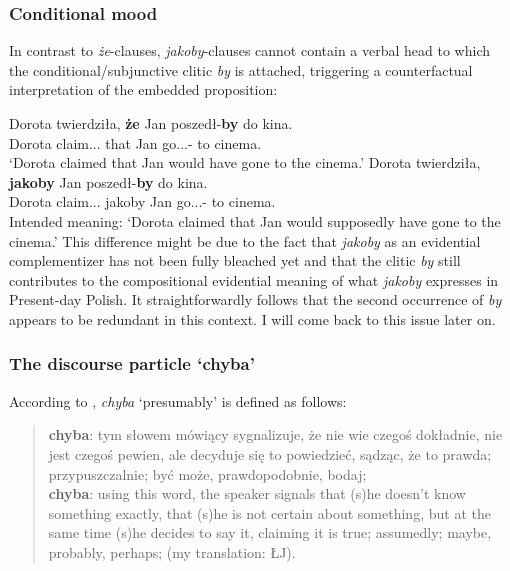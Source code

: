 \documentclass[output=paper
,modfonts
,nonflat]{langsci/langscibook}
\begin{document}
\subsubsection{Conditional mood}
In contrast to \emph{że}-clauses, \emph{jakoby}-clauses cannot contain a verbal head to which the conditional\slash subjunctive clitic \emph{by} is attached, triggering a counterfactual interpretation of the embedded proposition:

 \ea \ea \gll	Dorota twierdziła, \textbf{że} Jan poszedł-\textbf{by} do kina.\\
 		Dorota claim.{\lptcp}.{\sg}.{\fem} that Jan go.{\lptcp}.{\sg}.{\masc}-{\subj} to cinema.{\gen}\\
		\glt`Dorota claimed that Jan would have gone to the cinema.'
		\ex\gll		*Dorota twierdziła, \textbf{jakoby} Jan poszedł-\textbf{by} do kina. \\
 			Dorota claim.{\lptcp}.{\sg}.{\fem} jakoby Jan go.{\lptcp}.{\sg}.{\masc}-{\subj} to cinema.{\gen} \\
		\glt Intended meaning: `Dorota claimed that Jan would supposedly have gone to the cinema.'
\z\z
This difference might be due to the fact that \emph{jakoby} as an evidential complementizer has not been fully bleached yet and that the clitic \emph{by} still contributes to the compositional evidential meaning of what \emph{jakoby} expresses in Present-day Polish. It straightforwardly follows that the second occurrence of \emph{by} appears to be redundant in this context. I will come back to this issue later on.

\subsubsection{The discourse particle `chyba'}
According to \textcite{SWJP1998}, \emph{chyba} `presumably' is defined as follows:

\begin{quote}
\textbf{chyba}: tym słowem mówiący sygnalizuje, że nie wie czegoś dokładnie, nie jest czegoś pewien, ale decyduje się to powiedzieć, sądząc, że to prawda; przypuszczalnie; być może, prawdopodobnie, bodaj; \\ \textbf{chyba}: using this word, the speaker signals that (s)he doesn't know something exactly, that (s)he is not certain about something, but at the same time (s)he decides to say it, claiming it is true; assumedly; maybe, probably, perhaps;  (my translation: ŁJ).  \newline \textcite[117]{SWJP1998}
\end{quote}
\end{document}
